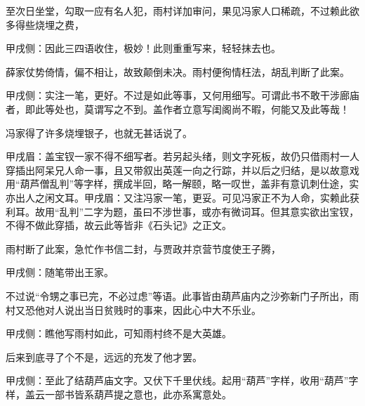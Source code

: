 \begin{parag}
    至次日坐堂，勾取一应有名人犯，雨村详加审问，果见冯家人口稀疏，不过赖此欲多得些烧埋之费，\begin{note}甲戌侧：因此三四语收住，极妙！此则重重写来，轻轻抹去也。\end{note}薛家仗势倚情，偏不相让，故致颠倒未决。雨村便徇情枉法，胡乱判断了此案。\begin{note}甲戌侧：实注一笔，更好。不过是如此等事，又何用细写。可谓此书不敢干涉廊庙者，即此等处也，莫谓写之不到。盖作者立意写闺阁尚不暇，何能又及此等哉！\end{note}冯家得了许多烧埋银子，也就无甚话说了。\begin{note}甲戌眉：盖宝钗一家不得不细写者。若另起头绪，则文字死板，故仍只借雨村一人穿插出阿呆兄人命一事，且又带叙出英莲一向之行踪，并以后之归结，是以故意戏用“葫芦僧乱判”等字样，撰成半回，略一解颐，略一叹世，盖非有意讥刺仕途，实亦出人之闲文耳。甲戌眉：又注冯家一笔，更妥。可见冯家正不为人命，实赖此获利耳。故用“乱判”二字为题，虽曰不涉世事，或亦有微词耳。但其意实欲出宝钗，不得不做此穿插，故云此等皆非《石头记》之正文。\end{note}雨村断了此案，急忙作书信二封，与贾政并京营节度使王子腾，\begin{note}甲戌侧：随笔带出王家。\end{note}不过说“令甥之事已完，不必过虑”等语。此事皆由葫芦庙内之沙弥新门子所出，雨村又恐他对人说出当日贫贱时的事来，因此心中大不乐业。\begin{note}甲戌侧：瞧他写雨村如此，可知雨村终不是大英雄。\end{note}后来到底寻了个不是，远远的充发了他才罢。\begin{note}甲戌侧：至此了结葫芦庙文字。又伏下千里伏线。起用“葫芦”字样，收用“葫芦”字样，盖云一部书皆系葫芦提之意也，此亦系寓意处。\end{note}
\end{parag}


